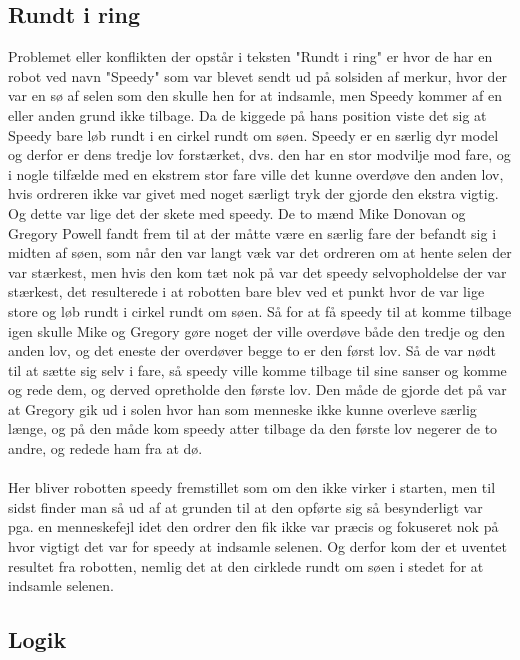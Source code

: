 \subsection{Rundt i ring}

Problemet eller konflikten der opstår i teksten "Rundt i ring" er hvor de har en robot ved navn "Speedy" som var blevet sendt ud på solsiden af merkur,
hvor der var en sø af selen som den skulle hen for at indsamle, men Speedy kommer af en eller anden grund ikke tilbage. Da de kiggede på hans position viste det sig
at Speedy bare løb rundt i en cirkel rundt om søen. Speedy er en særlig dyr model og derfor er dens tredje lov forstærket, dvs. den har en stor modvilje mod
fare, og i nogle tilfælde med en ekstrem stor fare ville det kunne overdøve den anden lov, hvis ordreren ikke var givet med noget særligt tryk der gjorde den
ekstra vigtig. Og dette var lige det der skete med speedy. De to mænd Mike Donovan og Gregory Powell fandt frem til at der måtte være en særlig fare der befandt
sig i midten af søen, som når den var langt væk var det ordreren om at hente selen der var stærkest, men hvis den kom tæt nok på var det speedy selvopholdelse
der var stærkest, det resulterede i at robotten bare blev ved et punkt hvor de var lige store og løb rundt i cirkel rundt om søen. Så for at få speedy til at komme tilbage igen
skulle Mike og Gregory gøre noget der ville overdøve både den tredje og den anden lov, og det eneste der overdøver begge to er den først lov. Så de var nødt til at sætte
sig selv i fare, så speedy ville komme tilbage til sine sanser og komme og rede dem, og derved opretholde den første lov. Den måde de gjorde det på var at Gregory gik ud i solen
hvor han som menneske ikke kunne overleve særlig længe, og på den måde kom speedy atter tilbage da den første lov negerer de to andre, og redede ham fra at dø.
\\
\\
Her bliver robotten speedy fremstillet som om den ikke virker i starten, men til sidst finder man så ud af at grunden til at den opførte sig så besynderligt var pga. en menneskefejl idet
den ordrer den fik ikke var præcis og fokuseret nok på hvor vigtigt det var for speedy at indsamle selenen. Og derfor kom der et uventet resultet fra robotten, nemlig det at den cirklede
rundt om søen i stedet for at indsamle selenen.

\subsection{Logik}

